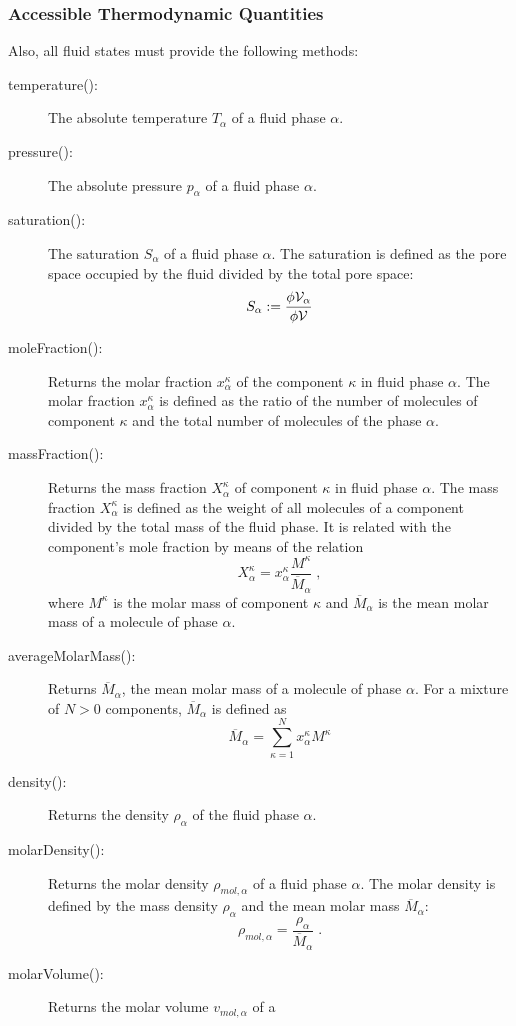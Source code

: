 \subsubsection{Accessible Thermodynamic Quantities}
Also, all fluid states must provide the following methods:
\begin{description}
\item[temperature():] The absolute temperature $T_\alpha$ of
  a fluid phase $\alpha$.
\item[pressure():] The absolute pressure $p_\alpha$ of a
  fluid phase $\alpha$.
\item[saturation():] The saturation $S_\alpha$ of a fluid phase
  $\alpha$. The saturation is defined as the pore space occupied by
  the fluid divided by the total pore space:
  \[
  S_\alpha := \frac{\phi \mathcal{V}_\alpha}{\phi \mathcal{V}}
  \]
\item[moleFraction():] Returns the molar fraction $x^\kappa_\alpha$ of
  the component $\kappa$ in fluid phase $\alpha$. The molar fraction
  $x^\kappa_\alpha$ is defined as the ratio of the number of molecules
  of component $\kappa$ and the total number of molecules of the phase
  $\alpha$.
\item[massFraction():] Returns the mass fraction $X^\kappa_\alpha$ of
  component $\kappa$ in fluid phase $\alpha$. The mass fraction
  $X^\kappa_\alpha$ is defined as the weight of all molecules of a
  component divided by the total mass of the fluid phase. It is
  related with the component's mole fraction by means of the relation
  \[
  X^\kappa_\alpha = x^\kappa_\alpha \frac{M^\kappa}{\overline M_\alpha}\;,
  \]
  where $M^\kappa$ is the molar mass of component $\kappa$ and
  $\overline M_\alpha$ is the mean molar mass of a molecule of phase
  $\alpha$.
\item[averageMolarMass():] Returns $\overline M_\alpha$, the mean
  molar mass of a molecule of phase $\alpha$. For a mixture of $N > 0$
  components, $\overline M_\alpha$ is defined as
  \[
  \overline M_\alpha = \sum_{\kappa=1}^{N} x^\kappa_\alpha M^\kappa
  \]
\item[density():] Returns the density $\rho_\alpha$ of the fluid phase
  $\alpha$.
\item[molarDensity():] Returns the molar density $\rho_{mol,\alpha}$
  of a fluid phase $\alpha$. The molar density is defined by the mass
  density $\rho_\alpha$ and the mean molar mass $\overline M_\alpha$:
  \[
  \rho_{mol,\alpha} = \frac{\rho_\alpha}{\overline M_\alpha} \;.
  \]
\item[molarVolume():] Returns the molar volume $v_{mol,\alpha}$ of a

\end{description}

